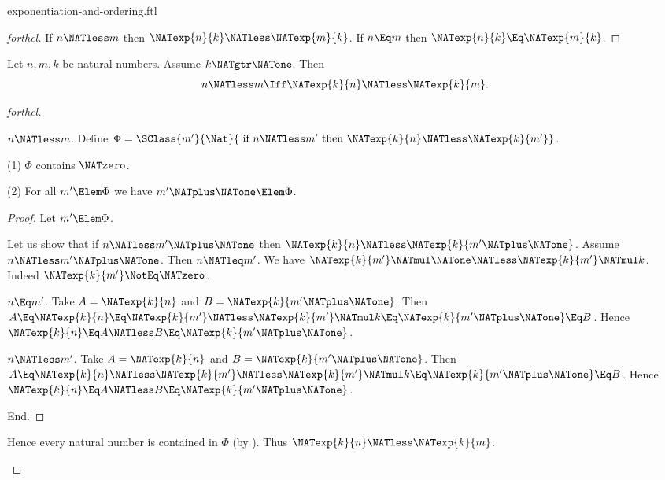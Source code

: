 \documentclass{stex}
\begin{document}
\begin{smodule}{exponentiation-and-ordering.ftl}
\begin{proof}[forthel]
  If $n \NATless m$ then $\NATexp{n}{k} \NATless \NATexp{m}{k}$.
  If $n \Eq m$ then $\NATexp{n}{k} \Eq \NATexp{m}{k}$.
\end{proof}

\begin{proposition}[forthel,id=ARITHMETIC_09_3349764703780864]
  Let $n, m, k$ be natural numbers.
  Assume $k \NATgtr \NATone$.
  Then \[ n \NATless m \Iff \NATexp{k}{n} \NATless \NATexp{k}{m}. \]
\end{proposition}
\begin{proof}[forthel]
  \begin{case}{$n \NATless m$.}
    Define $\Phi = \SClass{m'}{\Nat}{\text{ if }n \NATless m'\text{ then }\NATexp{k}{n} \NATless \NATexp{k}{m'}}$.

    (1) $\Phi$ contains $\NATzero$.

    (2) For all $m' \Elem \Phi$ we have $m' \NATplus \NATone \Elem \Phi$.
    \begin{proof}
      Let $m' \Elem \Phi$.

      Let us show that if $n \NATless m' \NATplus \NATone$ then $\NATexp{k}{n} \NATless \NATexp{k}{m' \NATplus \NATone}$.
        Assume $n \NATless m' \NATplus \NATone$.
        Then $n \NATleq m'$.
        We have $\NATexp{k}{m'} \NATmul \NATone \NATless \NATexp{k}{m'} \NATmul k$.
        Indeed $\NATexp{k}{m'} \NotEq \NATzero$.

        \begin{case}{$n \Eq m'$.}
          Take $A = \NATexp{k}{n}$ and $B = \NATexp{k}{m' \NATplus \NATone}$. %
          Then $A
            \Eq \NATexp{k}{n}
            \Eq \NATexp{k}{m'}
            \NATless \NATexp{k}{m'} \NATmul k
            \Eq \NATexp{k}{m' \NATplus \NATone}
            \Eq B$.
          Hence $\NATexp{k}{n} \Eq A \NATless B \Eq \NATexp{k}{m' \NATplus \NATone}$.
        \end{case}

        \begin{case}{$n \NATless m'$.}
          Take $A = \NATexp{k}{n}$ and $B = \NATexp{k}{m' \NATplus \NATone}$. %
          Then $A
            \Eq \NATexp{k}{n}
            \NATless \NATexp{k}{m'}
            \NATless \NATexp{k}{m'} \NATmul k
            \Eq \NATexp{k}{m' \NATplus \NATone}
            \Eq B$.
          Hence $\NATexp{k}{n} \Eq A \NATless B \Eq \NATexp{k}{m' \NATplus \NATone}$.
        \end{case}
      End.
    \end{proof}

    Hence every natural number is contained in $\Phi$ (by ).
    Thus $\NATexp{k}{n} \NATless \NATexp{k}{m}$.
  \end{case}


\end{proof}
\end{smodule}
\end{document}
